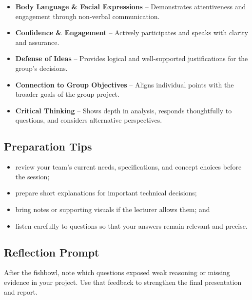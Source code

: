 \begin{itemize}
    \item \textbf{Body Language \& Facial Expressions} – Demonstrates attentiveness and engagement through non-verbal communication.
    \item \textbf{Confidence \& Engagement} – Actively participates and speaks with clarity and assurance.
    \item \textbf{Defense of Ideas} – Provides logical and well-supported justifications for the group’s decisions.
    \item \textbf{Connection to Group Objectives} – Aligns individual points with the broader goals of the group project.
    \item \textbf{Critical Thinking} – Shows depth in analysis, responds thoughtfully to questions, and considers alternative perspectives.
\end{itemize}

\subsection{Preparation Tips}
\begin{itemize}
    \item review your team's current needs, specifications, and concept choices before the session;
    \item prepare short explanations for important technical decisions;
    \item bring notes or supporting visuals if the lecturer allows them; and
    \item listen carefully to questions so that your answers remain relevant and precise.
\end{itemize}

\subsection{Reflection Prompt}

After the fishbowl, note which questions exposed weak reasoning or missing evidence in your project. Use that feedback to strengthen the final presentation and report.
